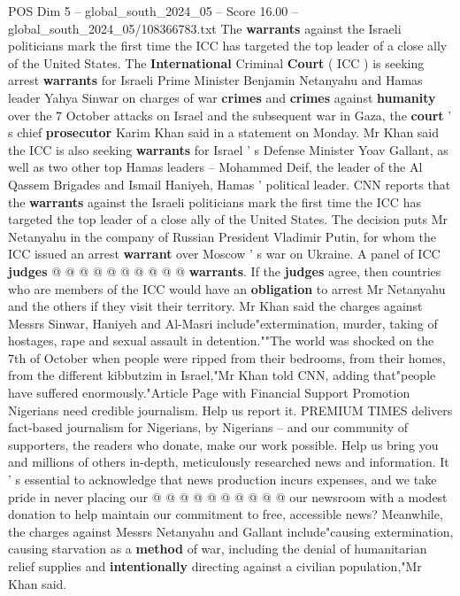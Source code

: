 \begin{textsample}{POS Dim 5 – global\_south\_2024\_05 – Score 16.00 – global\_south\_2024\_05/108366783.txt}  \label{ex:f5_pos_076}
The \textbf{warrants} against the Israeli politicians mark the first time the ICC has targeted the top leader of a close ally of the United States.
The \textbf{International} Criminal \textbf{Court} ( ICC ) is seeking arrest \textbf{warrants} for Israeli Prime Minister Benjamin Netanyahu and Hamas leader Yahya Sinwar on charges of war \textbf{crimes} and \textbf{crimes} against \textbf{humanity} over the 7 October attacks on Israel and the subsequent war in Gaza, the \textbf{court} ' s chief \textbf{prosecutor} Karim Khan said in a statement on Monday.
Mr Khan said the ICC is also seeking \textbf{warrants} for Israel ' s Defense Minister Yoav Gallant, as well as two other top Hamas leaders -- Mohammed Deif, the leader of the Al Qassem Brigades and Ismail Haniyeh, Hamas ' political leader.
CNN reports that the \textbf{warrants} against the Israeli politicians mark the first time the ICC has targeted the top leader of a close ally of the United States.
The decision puts Mr Netanyahu in the company of Russian President Vladimir Putin, for whom the ICC issued an arrest \textbf{warrant} over Moscow ' s war on Ukraine.
A panel of ICC \textbf{judges} @ @ @ @ @ @ @ @ @ @ \textbf{warrants}.
If the \textbf{judges} agree, then countries who are members of the ICC would have an \textbf{obligation} to arrest Mr Netanyahu and the others if they visit their territory.
Mr Khan said the charges against Messrs Sinwar, Haniyeh and Al-Masri include"extermination, murder, taking of hostages, rape and sexual assault in detention.""The world was shocked on the 7th of October when people were ripped from their bedrooms, from their homes, from the different kibbutzim in Israel,"Mr Khan told CNN, adding that"people have suffered enormously."Article Page with Financial Support Promotion Nigerians need credible journalism.
Help us report it.
PREMIUM TIMES delivers fact-based journalism for Nigerians, by Nigerians -- and our community of supporters, the readers who donate, make our work possible.
Help us bring you and millions of others in-depth, meticulously researched news and information.
It ' s essential to acknowledge that news production incurs expenses, and we take pride in never placing our @ @ @ @ @ @ @ @ @ @ our newsroom with a modest donation to help maintain our commitment to free, accessible news?
Meanwhile, the charges against Messrs Netanyahu and Gallant include"causing extermination, causing starvation as a \textbf{method} of war, including the denial of humanitarian relief supplies and \textbf{intentionally} directing against a civilian population,"Mr Khan said.

\end{textsample}
